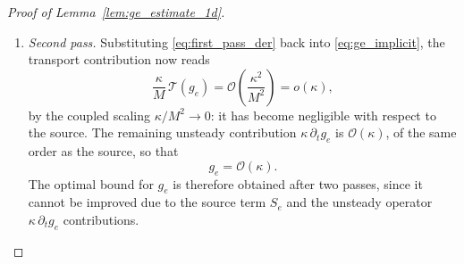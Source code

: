 \documentclass[pdflatex,final,10pt]{article}
\newcommand{\Del}[1]{#1}
\begin{document}
\begin{proof}[Proof of Lemma~\ref{lem:ge_estimate_1d}]
\begin{enumerate}
\begin{enumerate}
\Del{This term involves no derivative of $g$ beyond first order and is bounded on $L^\infty_v(\Omega_v)$ under the
uniform regularity assumptions. It is therefore $\mathcal{O}(1)$ in the first pass and, once
$\partial_x g_e = \mathcal{O}(\kappa/M)$ has been established, becomes
$\mathcal{O}(\kappa/M)$; after multiplication by $\kappa/M$ in
\eqref{eq:dv_equation} it contributes only $\mathcal{O}(\kappa^2/M^2) =
o(\kappa)$ and does not affect the final estimate.}




 Both equations \Del{\eqref{eq:dx_equation}--\eqref{eq:dv_equation} are governed by the same operator as equation} \eqref{eq:ge_balance}, and their right-hand sides involve only the differentiated source $S_e$, which is $\mathcal{O}(M)$ by \eqref{eq:source_exact}, together with lower-order derivatives of $g_e$. Estimating them in turn, the hierarchy being processed upwards from $g_e$, the first pass gives
\begin{equation} \label{eq:first_pass_der}
    \partial_x g_e = \mathcal{O}\!\left(\frac{\kappa}{M}\right),
    \quad
    \partial_v g_e = \mathcal{O}\!\left(\frac{\kappa}{M}\right).
\end{equation}
These estimates are sufficient to obtain the optimal bound on $g_e$ thanks to a second pass.

\item \emph{Second pass.} Substituting \eqref{eq:first_pass_der} back into
\eqref{eq:ge_implicit}, the transport contribution now reads
\begin{equation*}
    \frac{\kappa}{M}\,\mathcal{T}(g_e) = \mathcal{O}\!\left(\frac{\kappa^2}{M^2}\right) = o(\kappa),
\end{equation*}
by the coupled scaling $\kappa/M^2 \to 0$: it has become negligible with
respect to the source. The remaining unsteady contribution
$\kappa\,\partial_t g_e$ is $\mathcal{O}(\kappa)$, of the same order as the
source, so that
\begin{equation} \label{eq:ge_order_kappa}
    g_e = \mathcal{O}(\kappa) .
\end{equation}
The optimal bound for $g_e$ is therefore obtained after two passes, since it cannot be improved due to the source term $S_e$ and the unsteady operator $\kappa\,\partial_t g_e$  contributions.
\end{enumerate}


\end{enumerate}
\end{proof}
\end{document}

